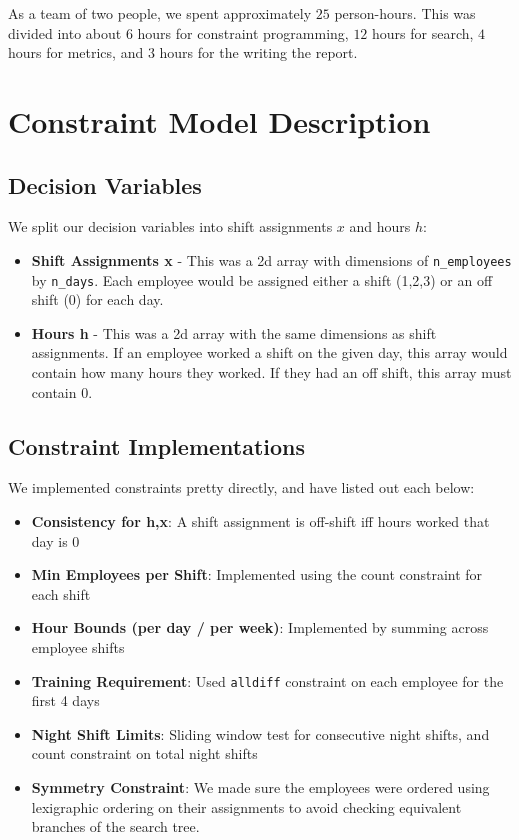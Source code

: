 \documentclass[11pt]{article}
\begin{document}
As a team of two people, we spent approximately $25$ person-hours. This was divided into about $6$ hours
for constraint programming, $12$ hours for search, $4$ hours for metrics, and $3$ hours
for the writing the report.
\vspace{-10pt}
\section*{Constraint Model Description}
\label{sec:intro}
\subsection*{Decision Variables}
We split our decision variables into shift assignments $x$ and hours $h$:
\begin{itemize}
    \item \textbf{Shift Assignments x} - This was a 2d array with dimensions of \texttt{n\_employees} 
        by \texttt{n\_days}. Each employee would be assigned either a shift (1,2,3) or an off shift (0)
        for each day.
    \item \textbf{Hours h} - This was a 2d array with the same dimensions as shift assignments. If an
        employee worked a shift on the given day, this array would contain how many hours they worked.
        If they had an off shift, this array must contain $0$.
\end{itemize}

\subsection*{Constraint Implementations}

We implemented constraints pretty directly, and have listed out each below:
\begin{itemize}
    \item \textbf{Consistency for h,x}: A shift assignment is off-shift iff hours worked that day is $0$
    \item \textbf{Min Employees per Shift}: Implemented using the count constraint for each shift
    \item \textbf{Hour Bounds (per day / per week)}: Implemented by summing across employee shifts
    \item \textbf{Training Requirement}: Used \texttt{alldiff} constraint on each employee for the first 4 days
    \item \textbf{Night Shift Limits}: Sliding window test for consecutive night shifts, and count constraint on total night shifts
    \item \textbf{Symmetry Constraint}: We made sure the employees were ordered using lexigraphic ordering on their assignments to avoid checking equivalent branches of the search tree.
\end{itemize}
\end{document}
